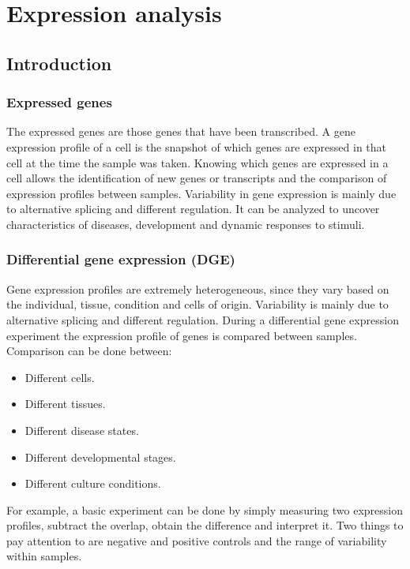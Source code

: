 \graphicspath{{chapters/05/images5/}}
\chapter{Expression analysis}

\section{Introduction}

	\subsection{Expressed genes}
	The expressed genes are those genes that have been transcribed.
	A gene expression profile of a cell is the snapshot of which genes are expressed in that cell at the time the sample was taken.
	Knowing which genes are expressed in a cell allows the identification of new genes or transcripts and the comparison of expression profiles between samples.
	Variability in gene expression is mainly due to alternative splicing and different regulation.
	It can be analyzed to uncover characteristics of diseases, development and dynamic responses to stimuli.

	\subsection{Differential gene expression (DGE)}
	Gene expression profiles are extremely heterogeneous, since they vary based on the individual, tissue, condition and cells of origin.
	Variability is mainly due to alternative splicing and different regulation.
	During a differential gene expression experiment the expression profile of genes is compared between samples.
	Comparison can be done between:

	\begin{multicols}{2}
		\begin{itemize}
			\item Different cells.
			\item Different tissues.
			\item Different disease states.
			\item Different developmental stages.
			\item Different culture conditions.
		\end{itemize}
	\end{multicols}
	For example, a basic experiment can be done by simply measuring two expression profiles, subtract the overlap, obtain the difference and interpret it.
	Two things to pay attention to are negative and positive controls and the range of variability within samples.


